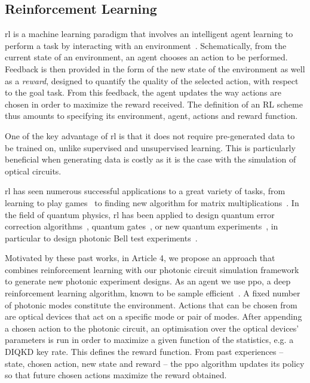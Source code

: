 \subsection{Reinforcement Learning}

\Acrfull{rl} is a machine learning paradigm that involves an intelligent agent learning to perform a task by interacting with an environment~\cite{Sutton2018}.
Schematically, from the current state of an environment, an agent chooses an action to be performed.
Feedback is then provided in the form of the new state of the environment as well as a \textit{reward}, designed to quantify the quality of the selected action, with respect to the goal task.
From this feedback, the agent updates the way actions are chosen in order to maximize the reward received. 
The definition of an RL scheme thus amounts to specifying its environment, agent, actions and reward function. 

One of the key advantage of \acrshort{rl} is that it does not require pre-generated data to be trained on, unlike supervised and unsupervised learning.
This is particularly beneficial when generating data is costly as it is the case with the simulation of optical circuits.

\medbreak

\acrshort{rl} has seen numerous successful applications to a great variety of tasks, from learning to play games~\cite{Mnih2015,Silver2017,Vinyals2019} to finding new algorithm for matrix multiplications~\cite{Fawzi2022}.
In the field of quantum physics, \acrshort{rl} has been applied to design quantum error correction algorithms~\cite{Andreasson2019,Nautrup2019,Sweke2020}, quantum gates~\cite{Niu2019}, or new quantum experiments~\cite{Melnikov2018,Krenn2016,Krenn2020,Krenn2021}, in particular to design photonic Bell test experiments~\cite{Melnikov2020}.

Motivated by these past works, in Article 4, we propose an approach that combines reinforcement learning with our photonic circuit simulation framework to generate new photonic experiment designs.
As an agent we use \acrfull{ppo}, a deep reinforcement learning algorithm, known to be sample efficient~\cite{Schulman2017}.
A fixed number of photonic modes constitute the environment.
Actions that can be chosen from are optical devices that act on a specific mode or pair of modes.
After appending a chosen action to the photonic circuit, an optimisation over the optical devices' parameters is run in order to maximize a given function of the statistics, e.g. a DIQKD key rate.
This defines the reward function.
From past experiences -- state, chosen action, new state and reward -- the \acrshort{ppo} algorithm updates its policy so that future chosen actions maximize the reward obtained.


